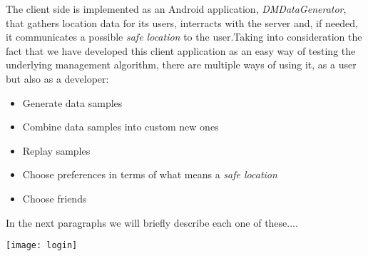 The client side is implemented as an Android application, \textit{DMDataGenerator}, that gathers location data for its users, interracts with the server and, if needed, it communicates a possible \textit{safe location} to the user.Taking into consideration the fact that we have developed this client application as an easy way of testing the underlying management algorithm, there are multiple ways of using it, as a user but also as a developer:
\begin{itemize}
\item Generate data samples
\item Combine data samples into custom new ones
\item Replay samples
\item Choose preferences in terms of what means a \textit{safe location}
\item Choose friends
\end{itemize}

In the next paragraphs we will briefly describe each one of these....

\texttt{[image: login]}
